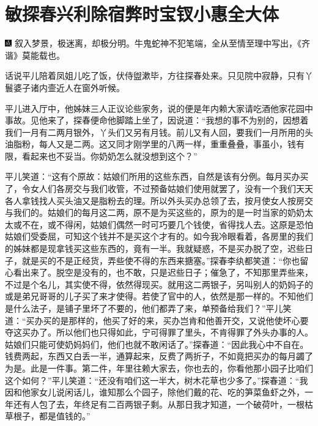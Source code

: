 

\chapter{敏探春兴利除宿弊\hspace{.5em}时宝钗小惠全大体}

{\includegraphics[width=3mm]{../Images/00005}  \kaishu 叙入梦景，极迷离，却极分明。牛鬼蛇神不犯笔端，全从至情至理中写出，《齐谐》莫能载也。}

话说平儿陪着凤姐儿吃了饭，伏侍盥漱毕，方往探春处来。只见院中寂静，只有丫鬟婆子诸内壸近人在窗外听候。

平儿进入厅中，他姊妹三人正议论些家务，说的便是年内赖大家请吃酒他家花园中事故。见他来了，探春便命他脚踏上坐了，因说道：``我想的事不为别的，因想着我们一月有二两月银外，丫头们又另有月钱。前儿又有人回，要我们一月所用的头油脂粉，每人又是二两。这又同才刚学里的八两一样，重重叠叠，事虽小，钱有限，看起来也不妥当。你奶奶怎么就没想到这个？''

平儿笑道：``这有个原故：姑娘们所用的这些东西，自然是该有分例。每月买办买了，令女人们各房交与我们收管，不过预备姑娘们使用就罢了，没有一个我们天天各人拿钱找人买头油又是脂粉去的理。所以外头买办总领了去，按月使女人按房交与我们的。姑娘们的每月这二两，原不是为买这些的，原为的是一时当家的奶奶太太或不在，或不得闲，姑娘们偶然一时可巧要几个钱使，省得找人去。这原是恐怕姑娘们受委屈，可知这个钱并不是买这个才有的。如今我冷眼看着，各房里的我们的姊妹都是现拿钱买这些东西的，竟有一半。我就疑惑，不是买办脱了空，迟些日子，就是买的不是正经货，弄些使不得的东西来搪塞。''探春李纨都笑道：``你也留心看出来了。脱空是没有的，也不敢，只是迟些日子；催急了，不知那里弄些来，不过是个名儿，其实使不得，依然得现买。就用这二两银子，另叫别人的奶妈子的或是弟兄哥哥的儿子买了来才使得。若使了官中的人，依然是那一样的。不知他们是什么法子，是铺子里坏了不要的，他们都弄了来，单预备给我们？''平儿笑道：``买办买的是那样的，他买了好的来，买办岂肯和他善开交，又说他使坏心要夺这买办了。所以他们也只得如此，宁可得罪了里头，不肯得罪了外头办事的人。姑娘们只能可使奶妈妈们，他们也就不敢闲话了。''探春道：``因此我心中不自在。钱费两起，东西又白丢一半，通算起来，反费了两折子，不如竟把买办的每月蠲了为是。此是一件事。第二件，年里往赖大家去，你也去的，你看他那小园子比咱们这个如何？''平儿笑道：``还没有咱们这一半大，树木花草也少多了。''探春道：``我因和他家女儿说闲话儿，谁知那么个园子，除他们戴的花、吃的笋菜鱼虾之外，一年还有人包了去，年终足有二百两银子剩。从那日我才知道，一个破荷叶，一根枯草根子，都是值钱的。''

